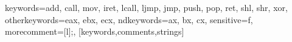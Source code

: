 %
  {keywords={add, call, mov, iret, lcall, ljmp, jmp, push, pop, ret, shl, shr, xor},%
   otherkeywords={eax, ebx, ecx},%
   ndkeywords={ax, bx, cx},%
   sensitive=f,%
   morecomment=[l]{;},%
  }[keywords,comments,strings]%


